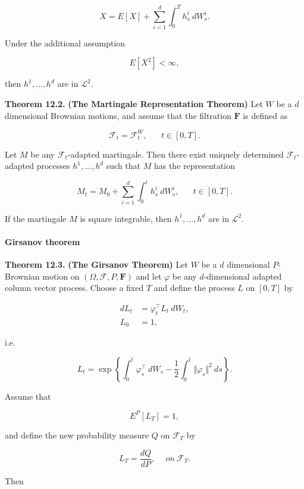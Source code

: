 \documentclass[
]{article}
\begin{document}
\[
X=E[X]+\sum_{i=1}^d\int_0^Th^i_s\ dW_s^i.
\]

Under the additional assumption

\[
E[X^2]<\infty,
\]

then \(h^1,...,h^d\) are in \(\mathcal{L}^2\).

\textbf{Theorem 12.2.} \textbf{(The Martingale Representation Theorem)}
Let \(W\) be a \(d\) dimensional Brownian motions, and assume that the
filtration \(\mathbf{F}\) is defined as

\[
\mathcal{F}_t=\mathcal{F}^W_t,\hspace{20pt}t\in[0,T].
\]

Let \(M\) be any \(\mathcal{F}_t\)-adapted martingale. Then there exist
uniquely determined \(\mathcal{F}_t\)-adapted processes \(h^1,...,h^d\)
such that \(M\) has the representation

\[
M_t=M_0+\sum_{i=1}^d\int_0^t h_s^i\ dW_s^i,\hspace{20pt}t\in[0,T].
\]

If the martingale \(M\) is square integrable, then \(h^1,...,h^d\) are
in \(\mathcal{L}^2\).

\hypertarget{girsanov-theorem}{%
\paragraph{Girsanov theorem}\label{girsanov-theorem}}

\textbf{Theorem 12.3.} \textbf{(The Girsanov Theorem)} Let \(W\) be a
\(d\) dimensional \(P\)-Brownian motion on
\((\Omega,\mathcal{F},P,\mathbf{F})\) and let \(\varphi\) be any
\(d\)-dimensional adapted column vector process. Choose a fixed \(T\)
and define the process \(L\) on \([0,T]\) by

\begin{align*}
dL_t&=\varphi^\top_t L_t\ dW_t,\\
L_0&=1,
\end{align*}

i.e.

\[
L_t = \exp\left\{\int_0^t \varphi^\top_s\ dW_s - \frac{1}{2}\int_0^t \Vert\varphi_s\Vert ^2\ ds\right\}.
\]

Assume that

\[
E^P[L_T]=1,
\]

and define the new probability measure \(Q\) on \(\mathcal{F}_T\) by

\[
L_T=\frac{dQ}{dP},\hspace{15pt}on\ \mathcal{F}_T.
\]

Then
\end{document}
